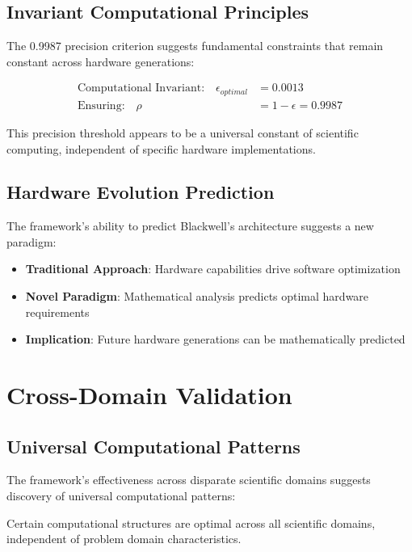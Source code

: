 \documentclass[11pt,a4paper]{article}
\begin{document}
\subsection{Invariant Computational Principles}
The 0.9987 precision criterion suggests fundamental constraints that remain constant across hardware generations:

\begin{align}
\text{Computational Invariant:} \quad \epsilon_{optimal} &= 0.0013 \\
\text{Ensuring:} \quad \rho &= 1 - \epsilon = 0.9987
\end{align}

This precision threshold appears to be a universal constant of scientific computing, independent of specific hardware implementations.

\subsection{Hardware Evolution Prediction}
The framework's ability to predict Blackwell's architecture suggests a new paradigm:

\begin{itemize}
\item \textbf{Traditional Approach}: Hardware capabilities drive software optimization
\item \textbf{Novel Paradigm}: Mathematical analysis predicts optimal hardware requirements
\item \textbf{Implication}: Future hardware generations can be mathematically predicted
\end{itemize}

\section{Cross-Domain Validation}

\subsection{Universal Computational Patterns}
The framework's effectiveness across disparate scientific domains suggests discovery of universal computational patterns:

\begin{theorem}
Certain computational structures are optimal across all scientific domains, independent of problem domain characteristics.
\end{theorem}
\end{document}
